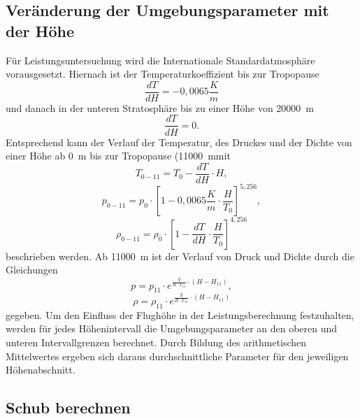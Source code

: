\subsection{Veränderung der Umgebungsparameter mit der Höhe}
Für Leistungsuntersuchung wird die Internationale Standardatmosphäre vorausgesetzt. Hiernach ist der Temperaturkoeffizient bis zur Tropopause
\begin{equation}
	\frac{dT}{dH} = -0,0065\frac{K}{m}
\end{equation}
und danach in der unteren Stratosphäre bis zu einer Höhe von \SI{20000}{m}
\begin{equation}
	\frac{dT}{dH} = 0.
\end{equation}
Entsprechend kann der Verlauf der Temperatur, des Druckes und der Dichte von einer Höhe ab \SI{0}{m} bis zur Tropopause (\SI{11000}{m}mit
\begin{equation}
	T_{0-11} = T_0 - \frac{dT}{dH}\cdot H,
\end{equation}
\begin{equation}
	p_{0-11} = p_0\cdot [1-0,0065\frac{K}{m}\cdot \frac{H}{T_0}]^{5,256},
\end{equation}
\begin{equation}
	\rho_{0-11} = \rho_0 \cdot [1-\frac{dT}{dH}\cdot \frac{H}{T_0}]^{4,256}
\end{equation}
beschrieben werden. Ab \SI{11000}{m} ist der Verlauf von Druck und Dichte durch die Gleichungen
\begin{equation}
	p = p_{11}\cdot e^{\frac{g}{R\cdot T_{11}}\cdot (H-H_{11})},
\end{equation} 
\begin{equation}
	\rho = \rho_{11}\cdot e^{\frac{g}{R\cdot T_{11}}\cdot (H-H_{11})}
\end{equation}
gegeben.
Um den Einfluss der Flughöhe in der Leistungsberechnung festzuhalten, werden für jedes Höhenintervall die Umgebungsparameter an den oberen und unteren Intervallgrenzen berechnet. Durch Bildung des arithmetischen Mittelwertes ergeben sich daraus durchschnittliche Parameter für den jeweiligen Höhenabschnitt.  

\subsection{Schub berechnen}
